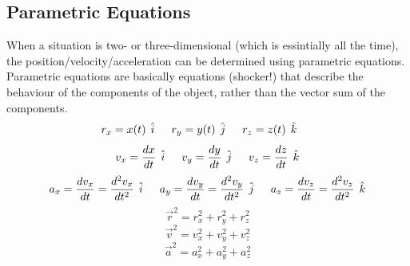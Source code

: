 \documentclass{article}
\begin{document}
	\subsection{Parametric Equations}
    	When a situation is two- or three-dimensional (which is essintially all the time), the position/velocity/acceleration can be determined using parametric equations. Parametric equations are basically equations (shocker!) that describe the behaviour of the components of the object, rather than the vector sum of the components.
        \[
        	r_x=x(t) \hspace{1ex} \hat{i} \indent
            r_y=y(t) \hspace{1ex} \hat{j} \indent
            r_z=z(t) \hspace{1ex} \hat{k} \indent
        \]
        \[
        	v_x=\frac{dx}{dt} \hspace{1ex} \hat{i} \indent
            v_y=\frac{dy}{dt} \hspace{1ex} \hat{j} \indent
            v_z=\frac{dz}{dt} \hspace{1ex} \hat{k}
        \]
        \[
        	a_x=\frac{dv_x}{dt}=\frac{d^2v_x}{dt^2} \hspace{1ex} \hat{i} \indent
            a_y=\frac{dv_y}{dt}=\frac{d^2v_y}{dt^2} \hspace{1ex} \hat{j} \indent
            a_z=\frac{dv_z}{dt}=\frac{d^2v_z}{dt^2} \hspace{1ex} \hat{k}
        \]
        \[
        	\vec{r}^2=r_x^2+r_y^2+r_z^2
        \]
        \[
        	\vec{v}^2=v_x^2+v_y^2+v_z^2
        \]
        \[
        	\vec{a}^2=a_x^2+a_y^2+a_z^2
        \]
\end{document}
